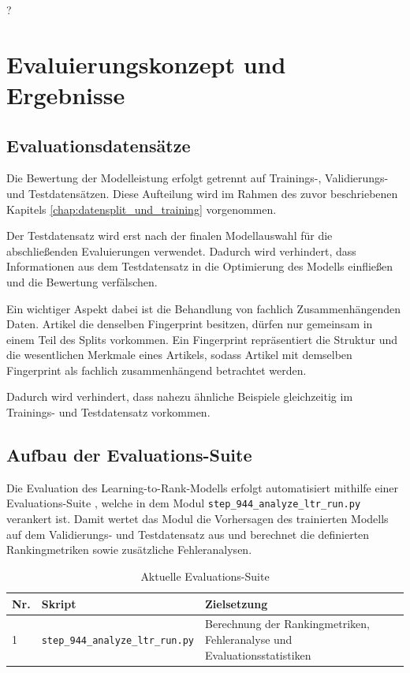 ﻿?\chapter{Evaluierungskonzept und Ergebnisse}
\label{chap:evaluierungskonzept_und_ergebnisse}

\section{Evaluationsdatensätze}

Die Bewertung der Modelleistung erfolgt getrennt auf Trainings-, Validierungs- und Testdatensätzen.
Diese Aufteilung wird im Rahmen des zuvor beschriebenen Kapitels \ref{chap:datensplit_und_training} vorgenommen.

Der Testdatensatz wird erst nach der finalen Modellauswahl für die abschließenden Evaluierungen verwendet.
Dadurch wird verhindert, dass Informationen aus dem Testdatensatz in die Optimierung des Modells einfließen und die Bewertung verfälschen.

Ein wichtiger Aspekt dabei ist die Behandlung von fachlich Zusammenhängenden Daten. Artikel die denselben Fingerprint besitzen, dürfen nur gemeinsam in einem Teil des Splits vorkommen.
Ein Fingerprint repräsentiert die Struktur und die wesentlichen Merkmale eines Artikels, sodass Artikel mit demselben Fingerprint als fachlich zusammenhängend betrachtet werden.

Dadurch wird verhindert, dass nahezu ähnliche Beispiele gleichzeitig im Trainings- und Testdatensatz vorkommen.

\section{Aufbau der Evaluations-Suite} 

Die Evaluation des Learning-to-Rank-Modells erfolgt automatisiert mithilfe einer Evaluations-Suite \parencite{srcEvalSuite}, welche in dem Modul \texttt{step\_944\_analyze\_ltr\_run.py} verankert ist.
Damit wertet das Modul die Vorhersagen des trainierten Modells auf dem Validierungs- und Testdatensatz aus und berechnet die definierten Rankingmetriken sowie zusätzliche Fehleranalysen.

\begin{table}[tbp] 
  \centering 
  \caption{Aktuelle Evaluations-Suite} 
  \label{tab:evaluations_suite} \begin{tabularx}{\textwidth}{p{1cm}p{5cm}X} 
    \toprule 
    \textbf{Nr.} & \textbf{Skript} & \textbf{Zielsetzung} \\ 
    \midrule 1 & \texttt{step\_944\_analyze\_ltr\_run.py} & Berechnung der Rankingmetriken, Fehleranalyse und Evaluationsstatistiken \\ 
    \bottomrule 
  \end{tabularx} 
\end{table}

